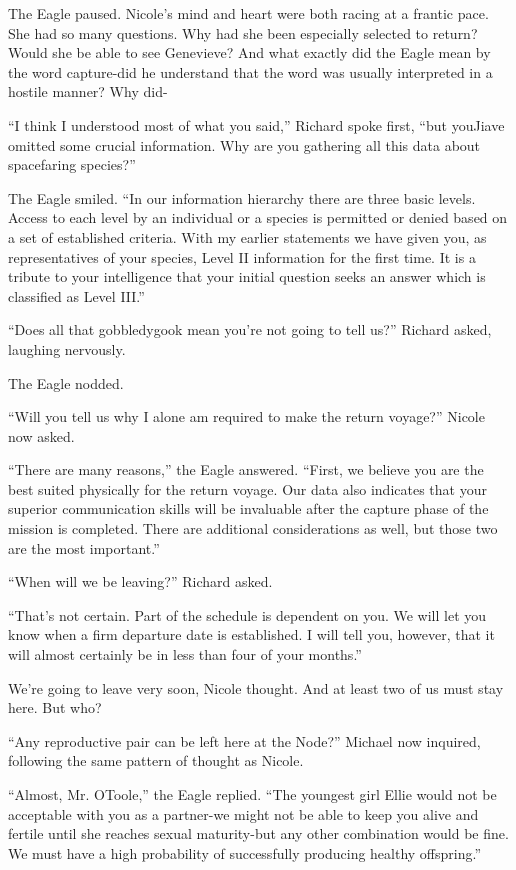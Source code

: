 \documentclass[]{article}
\begin{document}
{The Eagle paused. Nicole’s mind and heart were both racing at a frantic pace. She had so many questions. Why had she been especially selected to return? Would she be able to see Genevieve? And what exactly did the Eagle mean by the word capture-did he understand that the word was usually interpreted in a hostile manner? Why did-

“I think I understood most of what you said,” Richard spoke first, “but youJiave omitted some crucial information. Why are you gathering all this data about spacefaring species?”

The Eagle smiled. “In our information hierarchy there are three basic levels. Access to each level by an individual or a species is permitted or denied based on a set of established criteria. With my earlier statements we have given you, as representatives of your species, Level II information for the first time. It is a tribute to your intelligence that your initial question seeks an answer which is classified as Level III.”

“Does all that gobbledygook mean you’re not going to tell us?” Richard asked, laughing nervously.

The Eagle nodded.

“Will you tell us why I alone am required to make the return voyage?” Nicole now asked.

“There are many reasons,” the Eagle answered. “First, we believe you are the best suited physically for the return voyage. Our data also indicates that your superior communication skills will be invaluable after the capture phase of the mission is completed. There are additional considerations as well, but those two are the most important.”

“When will we be leaving?” Richard asked.

“That’s not certain. Part of the schedule is dependent on you. We will let you know when a firm departure date is established. I will tell you, however, that it will almost certainly be in less than four of your months.”

We’re going to leave very soon, Nicole thought. And at least two of us must stay here. But who?

“Any reproductive pair can be left here at the Node?” Michael now inquired, following the same pattern of thought as Nicole.

“Almost, Mr. OToole,” the Eagle replied. “The youngest girl Ellie would not be acceptable with you as a partner-we might not be able to keep you alive and fertile until she reaches sexual maturity-but any other combination would be fine. We must have a high probability of successfully producing healthy offspring.”

}
\end{document}
